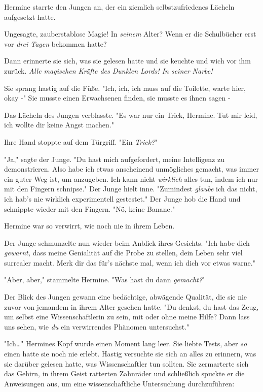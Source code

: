 {Hermine starrte den Jungen an, der ein ziemlich selbstzufriedenes Lächeln aufgesetzt hatte.

Ungesagte, zauberstablose Magie! In \emph{seinem} Alter? Wenn er die Schulbücher erst vor \emph{drei Tagen} bekommen hatte?

Dann erinnerte sie sich, was sie gelesen hatte und sie keuchte und wich vor ihm zurück. \emph{Alle magischen Kräfte des Dunklen Lords! In seiner Narbe!}

Sie sprang hastig auf die Füße. "Ich, ich, ich muss auf die Toilette, warte hier, okay -" Sie musste einen Erwachsenen finden, sie musste es ihnen sagen -

Das Lächeln des Jungen verblasste. "Es war nur ein Trick, Hermine. Tut mir leid, ich wollte dir keine Angst machen."

Ihre Hand stoppte auf dem Türgriff. "Ein \emph{Trick?}"

"Ja," sagte der Junge. "Du hast mich aufgefordert, meine Intelligenz zu demonstrieren. Also habe ich etwas anscheinend unmögliches gemacht, was immer ein guter Weg ist, um anzugeben. Ich kann nicht \emph{wirklich} alles tun, indem ich nur mit den Fingern schnipse." Der Junge hielt inne. "Zumindest \emph{glaube} ich das nicht, ich hab's nie wirklich experimentell gestestet." Der Junge hob die Hand und schnippte wieder mit den Fingern. "Nö, keine Banane."

Hermine war so verwirrt, wie noch nie in ihrem Leben.

Der Junge schmunzelte nun wieder beim Anblick ihres Gesichts. "Ich habe dich \emph{gewarnt,} dass meine Genialität auf die Probe zu stellen, dein Leben sehr viel surrealer macht. Merk dir das für's nächste mal, wenn ich dich vor etwas warne."

"Aber, aber," stammelte Hermine. "Was hast du dann \emph{gemacht?}"

Der Blick des Jungen gewann eine bedächtige, abwägende Qualität, die sie nie zuvor von jemandem in ihrem Alter gesehen hatte. "Du denkst, du hast das Zeug, um selbst eine Wissenschaftlerin zu sein, mit oder ohne meine Hilfe? Dann lass uns sehen, wie \emph{du} ein verwirrendes Phänomen untersuchst."

"Ich…" Hermines Kopf wurde einen Moment lang leer. Sie liebte Tests, aber \emph{so} einen hatte sie noch nie erlebt. Hastig versuchte sie sich an alles zu erinnern, was sie darüber gelesen hatte, was Wissenschaftler tun sollten. Sie zermarterte sich das Gehirn, in ihrem Geist ratterten Zahnräder und schließlich spuckte er die Anweisungen aus, um eine wissenschaftliche Untersuchung durchzuführen:

}
